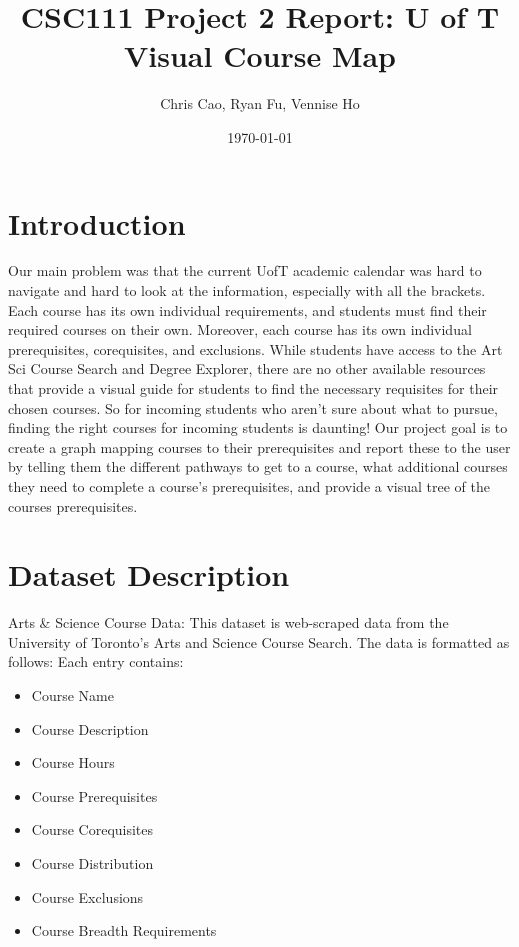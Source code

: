 \documentclass[fontsize=11pt]{article}
\title{CSC111 Project 2 Report: U of T Visual Course Map}
\author{Chris Cao, Ryan Fu, Vennise Ho}
\date{\today}
\begin{document}
\maketitle

\section*{Introduction}

Our main problem was that the current UofT academic calendar was hard to navigate and hard to look at the information, especially with all the brackets. Each course has its own individual requirements, and students must find their required courses on their own. Moreover, each course has its own individual prerequisites, corequisites, and exclusions. While students have access to the Art Sci Course Search and Degree Explorer, there are no other available resources that provide a visual guide for students to find the necessary requisites for their chosen courses. So for incoming students who aren’t sure about what to pursue, finding the right courses for incoming students is daunting! Our project goal is to create a graph mapping courses to their prerequisites and report these to the user by telling them the different pathways to get to a course, what additional courses they need to complete a course's prerequisites, and provide a visual tree of the courses prerequisites.

\section*{Dataset Description}

Arts \& Science Course Data: This dataset is web-scraped data from the University of Toronto’s Arts and Science Course Search. The data is formatted as follows:
\newline
Each entry contains:

\begin{itemize}
  \item Course Name
  \item Course Description
  \item Course Hours
  \item Course Prerequisites
  \item Course Corequisites
  \item Course Distribution
  \item Course Exclusions
  \item Course Breadth Requirements
\end{itemize}
\end{document}
